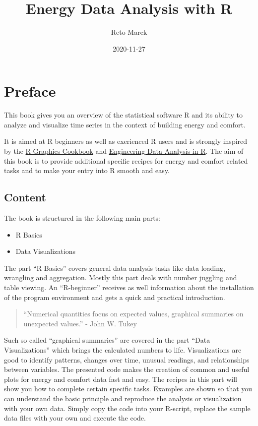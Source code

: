 \documentclass[
]{book}
\title{Energy Data Analysis with R}
\author{Reto Marek}
\date{2020-11-27}
\begin{document}
\maketitle

{
\setcounter{tocdepth}{1}
\tableofcontents
}
\hypertarget{preface}{%
\chapter{Preface}\label{preface}}

This book gives you an overview of the statistical software R and its ability to analyze and visualize time series in the context of building energy and comfort.

It is aimed at R beginners as well as exerienced R users and is strongly inspired by the \href{https://r-graphics.org/}{R Graphics Cookbook} and \href{https://smogdr.github.io/edar_coursebook/}{Engineering Data Analysis in R}. The aim of this book is to provide additional specific recipes for energy and comfort related tasks and to make your entry into R smooth and easy.

\hypertarget{content}{%
\section{Content}\label{content}}

The book is structured in the following main parts:

\begin{itemize}
\item
  R Basics
\item
  Data Visualizations
\end{itemize}

The part ``R Basics'' covers general data analysis tasks like data loading, wrangling and aggregation. Mostly this part deals with number juggling and table viewing. An ``R-beginner'' receives as well information about the installation of the program environment and gets a quick and practical introduction.

\begin{quote}
``Numerical quantities focus on expected values, graphical summaries on unexpected values.'' - John W. Tukey
\end{quote}

Such so called ``graphical summaries'' are covered in the part ``Data Visualizations'' which brings the calculated numbers to life. Visualizations are good to identify patterns, changes over time, unusual readings, and relationships between variables. The presented code makes the creation of common and useful plots for energy and comfort data fast and easy.
The recipes in this part will show you how to complete certain specific tasks. Examples are shown so that you can understand the basic principle and reproduce the analysis or visualization with your own data. Simply copy the code into your R-script, replace the sample data files with your own and execute the code.
\end{document}
